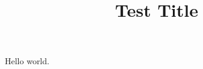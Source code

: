 ﻿\documentclass[conference]{IEEEtran}
\begin{document}
\title{Test Title}
\author{}
\maketitle
Hello world.
\end{document}
